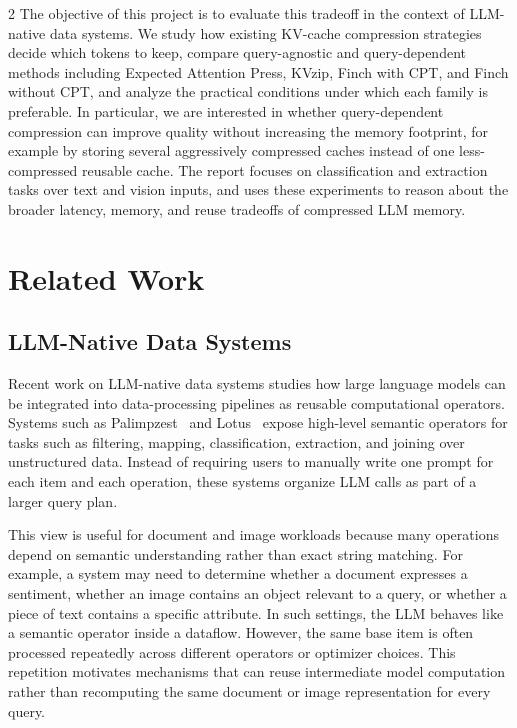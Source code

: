 \documentclass[10pt,a4paper]{article}
\begin{document}
\begin{multicols}{2}
The objective of this project is to evaluate this tradeoff in the context of
LLM-native data systems. We study how existing KV-cache compression strategies
decide which tokens to keep, compare query-agnostic and query-dependent methods
including Expected Attention Press, KVzip, Finch with CPT, and Finch without
CPT, and analyze the practical conditions under which each family is
preferable. In particular, we are interested in whether query-dependent
compression can improve quality without increasing the memory footprint, for
example by storing several aggressively compressed caches instead of one
less-compressed reusable cache. The report focuses on classification and
extraction tasks over text and vision inputs, and uses these experiments to
reason about the broader latency, memory, and reuse tradeoffs of compressed LLM
memory.

\section{Related Work}

\subsection{LLM-Native Data Systems}

Recent work on LLM-native data systems studies how large language models can be
integrated into data-processing pipelines as reusable computational operators.
Systems such as Palimpzest~\cite{palimpzest} and Lotus~\cite{lotus} expose
high-level semantic operators for tasks such as filtering, mapping,
classification, extraction, and joining over unstructured data. Instead of
requiring users to manually write one prompt for each item and each operation,
these systems organize LLM calls as part of a larger query plan.

This view is useful for document and image workloads because many operations
depend on semantic understanding rather than exact string matching. For
example, a system may need to determine whether a document expresses a
sentiment, whether an image contains an object relevant to a query, or whether a
piece of text contains a specific attribute. In such settings, the LLM behaves
like a semantic operator inside a dataflow. However, the same base item is often
processed repeatedly across different operators or optimizer choices. This
repetition motivates mechanisms that can reuse intermediate model computation
rather than recomputing the same document or image representation for every
query.


\end{multicols}
\end{document}
